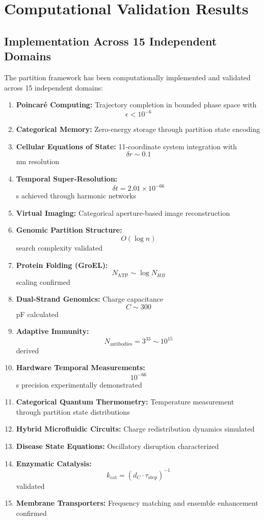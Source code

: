 \documentclass[12pt,a4paper]{article}
\begin{document}
\section{Computational Validation Results}

\subsection{Implementation Across 15 Independent Domains}

The partition framework has been computationally implemented and validated across 15 independent domains:

\begin{enumerate}
\item \textbf{Poincaré Computing:} Trajectory completion in bounded phase space with $$\epsilon < 10^{-6}$$
\item \textbf{Categorical Memory:} Zero-energy storage through partition state encoding
\item \textbf{Cellular Equations of State:} 11-coordinate system integration with $$\delta r \sim 0.1$$ nm resolution
\item \textbf{Temporal Super-Resolution:} $$\delta t = 2.01 \times 10^{-66}$$ s achieved through harmonic networks
\item \textbf{Virtual Imaging:} Categorical aperture-based image reconstruction
\item \textbf{Genomic Partition Structure:} $$O(\log n)$$ search complexity validated
\item \textbf{Protein Folding (GroEL):} $$N_{\text{ATP}} \sim \log N_{HB}$$ scaling confirmed
\item \textbf{Dual-Strand Genomics:} Charge capacitance $$C \sim 300$$ pF calculated
\item \textbf{Adaptive Immunity:} $$N_{\text{antibodies}} = 3^{33} \sim 10^{15}$$ derived
\item \textbf{Hardware Temporal Measurements:} $$10^{-66}$$ s precision experimentally demonstrated
\item \textbf{Categorical Quantum Thermometry:} Temperature measurement through partition state distributions
\item \textbf{Hybrid Microfluidic Circuits:} Charge redistribution dynamics simulated
\item \textbf{Disease State Equations:} Oscillatory disruption characterized
\item \textbf{Enzymatic Catalysis:} $$k_{\text{cat}} = (d_C \cdot \tau_{\text{step}})^{-1}$$ validated
\item \textbf{Membrane Transporters:} Frequency matching and ensemble enhancement confirmed
\end{enumerate}
\end{document}
